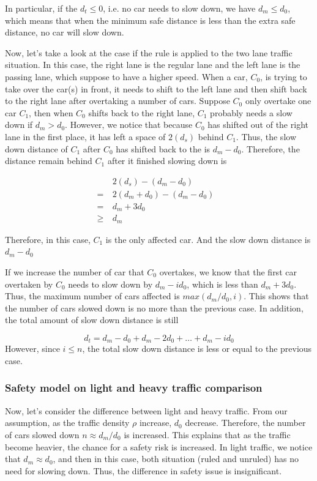 In particular, if the $d_t \le 0$, i.e. no car needs to slow down, we have $d_m\le d_0$, which means that when the minimum safe distance is less than the extra safe distance, no car will slow down. 

Now, let's take a look at the case if the rule is applied to the two lane traffic situation. In this case, the right lane is the regular lane and the left lane is the passing lane, which suppose to have a higher speed. When a car, $C_0$, is trying to take over the car(s) in front, it needs to shift to the left lane and then shift back to the right lane after overtaking a number of cars. Suppose $C_0$ only overtake one car $C_1$, then when $C_0$ shifts back to the right lane, $C_1$ probably needs a slow down if $d_m>d_0$. However, we notice that because $C_0$ has shifted out of the right lane in the first place, it has left a space of $2(d_s)$ behind $C_1$. Thus, the slow down distance of $C_1$ after $C_0$ has shifted back to the is $d_m-d_0$. Therefore, the distance remain behind $C_1$ after it finished slowing down is

\begin{align}
&2(d_s)-(d_m-d_0)&\\
=\ &2(d_m+d_0)-(d_m-d_0)&\\
=\ &d_m+3d_0&\\
\ge \ &d_m&
\end{align}

Therefore, in this case, $C_1$ is the only affected car. And the slow down distance is $d_m-d_0$

If we increase the number of car that $C_0$ overtakes, we know that the first car overtaken by $C_0$ needs to slow down by $d_m-id_0$, which is less than $d_m+3d_0$. Thus, the maximum number of cars affected is $max(d_m/d_0, i)$. This shows that the number of cars slowed down is no more than the previous case. In addition, the total amount of slow down distance is still

\begin{equation}
d_t = d_m-d_0 + d_m-2d_0 + \dots + d_m - id_0 
\end{equation}
However, since $i\le n$, the total slow down distance is less or equal to the previous case. 


\subsubsection{Safety model on light and heavy traffic comparison}

Now, let's consider the difference between light and heavy traffic. From our assumption, as the traffic density $\rho$ increase, $d_0$ decrease. Therefore, the number of cars slowed down $n\approx d_m/d_0$ is increased. This explains that as the traffic become heavier, the chance for a safety risk is increased. In light traffic, we notice that $d_m \approx d_0$, and then in this case, both situation (ruled and unruled) has no need for slowing down. Thus, the difference in safety issue is insignificant. 